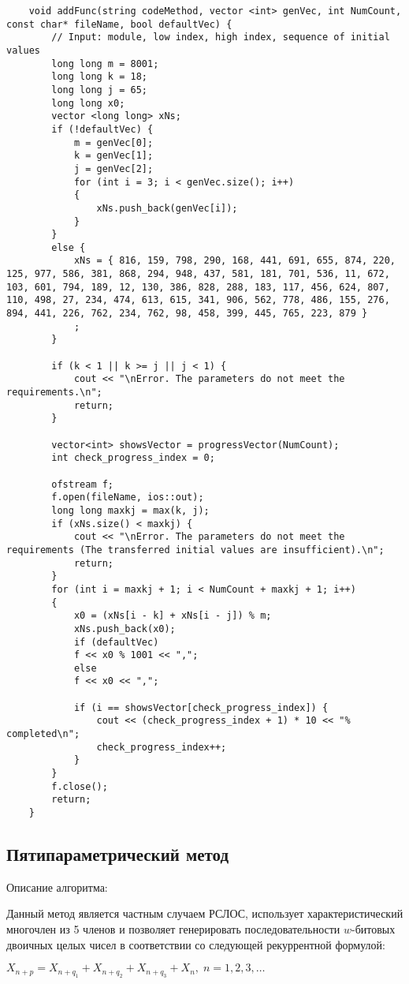 \documentclass[bachelor, och, coursework]{shiza}
\begin{document}
	\begin{verbatim}
	void addFunc(string codeMethod, vector <int> genVec, int NumCount, const char* fileName, bool defaultVec) {
		// Input: module, low index, high index, sequence of initial values
		long long m = 8001;
		long long k = 18;
		long long j = 65;
		long long x0;
		vector <long long> xNs;
		if (!defaultVec) {
			m = genVec[0];
			k = genVec[1];
			j = genVec[2];
			for (int i = 3; i < genVec.size(); i++)
			{
				xNs.push_back(genVec[i]);
			}
		}
		else {
			xNs = { 816, 159, 798, 290, 168, 441, 691, 655, 874, 220, 125, 977, 586, 381, 868, 294, 948, 437, 581, 181, 701, 536, 11, 672, 103, 601, 794, 189, 12, 130, 386, 828, 288, 183, 117, 456, 624, 807, 110, 498, 27, 234, 474, 613, 615, 341, 906, 562, 778, 486, 155, 276, 894, 441, 226, 762, 234, 762, 98, 458, 399, 445, 765, 223, 879 }
			;
		}
		
		if (k < 1 || k >= j || j < 1) {
			cout << "\nError. The parameters do not meet the requirements.\n";
			return;
		}
		
		vector<int> showsVector = progressVector(NumCount);
		int check_progress_index = 0;
		
		ofstream f;
		f.open(fileName, ios::out);
		long long maxkj = max(k, j);
		if (xNs.size() < maxkj) {
			cout << "\nError. The parameters do not meet the requirements (The transferred initial values are insufficient).\n";
			return;
		}
		for (int i = maxkj + 1; i < NumCount + maxkj + 1; i++)
		{
			x0 = (xNs[i - k] + xNs[i - j]) % m;
			xNs.push_back(x0);
			if (defaultVec)
			f << x0 % 1001 << ",";
			else
			f << x0 << ",";
			
			if (i == showsVector[check_progress_index]) {
				cout << (check_progress_index + 1) * 10 << "% completed\n";
				check_progress_index++;
			}
		}
		f.close();
		return;
	}
	\end{verbatim}
	
	\subsection{Пятипараметрический метод}
	
	Описание алгоритма:
	
	Данный метод является частным случаем РСЛОС, использует характеристический многочлен из 5 членов и позволяет генерировать последовательности $w$-битовых двоичных целых чисел в соответствии со следующей рекуррентной 
	формулой:
	\begin{center}
		$X_{n + p} = X_{n + q_1} + X_{n + q_2} + X_{n + q_3} + X_n, \; n = 1, 2, 3, \dots$
	\end{center}
	
\end{document}
